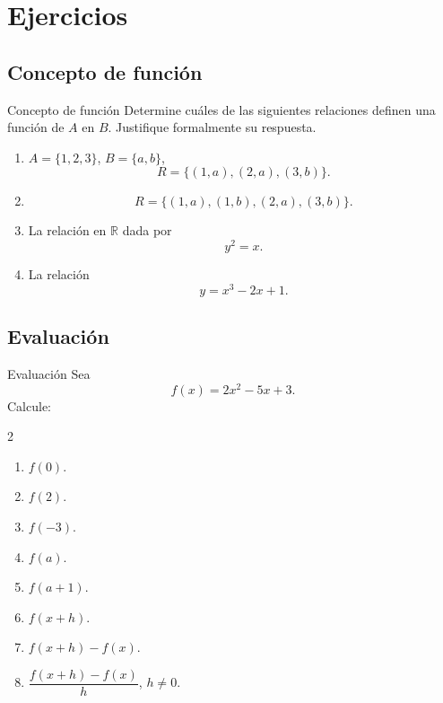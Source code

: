 \documentclass[aspectratio=169,10pt]{beamer}
\newcommand{\R}{\mathbb{R}}
\begin{document}
\section{Ejercicios}
\subsection*{Concepto de función}
\begin{frame}{Concepto de función}
Determine cuáles de las siguientes relaciones definen una función de $A$ en
$B$. Justifique formalmente su respuesta.

\begin{enumerate}
    \item $A=\{1,2,3\}$, $B=\{a,b\}$,
    \[
    R=\{(1,a),(2,a),(3,b)\}.
    \]
    \item
    \[
    R=\{(1,a),(1,b),(2,a),(3,b)\}.
    \]
    \item La relación en $\R$ dada por
    \[
    y^2=x.
    \]
    \item La relación
    \[
    y=x^3-2x+1.
    \]
\end{enumerate}
\end{frame}
\subsection*{Evaluación}
\begin{frame}{Evaluación}
Sea
\[
f(x)=2x^2-5x+3.
\]
Calcule:
\begin{multicols}{2}
\begin{enumerate}
    \item $f(0)$.
    \item $f(2)$.
    \item $f(-3)$.
    \item $f(a)$.
    \item $f(a+1)$.
    \item $f(x+h)$.
    \item $f(x+h)-f(x)$.
    \item $\dfrac{f(x+h)-f(x)}{h}$, $h\neq0$.
\end{enumerate}
\end{multicols}
\end{frame}
\end{document}
